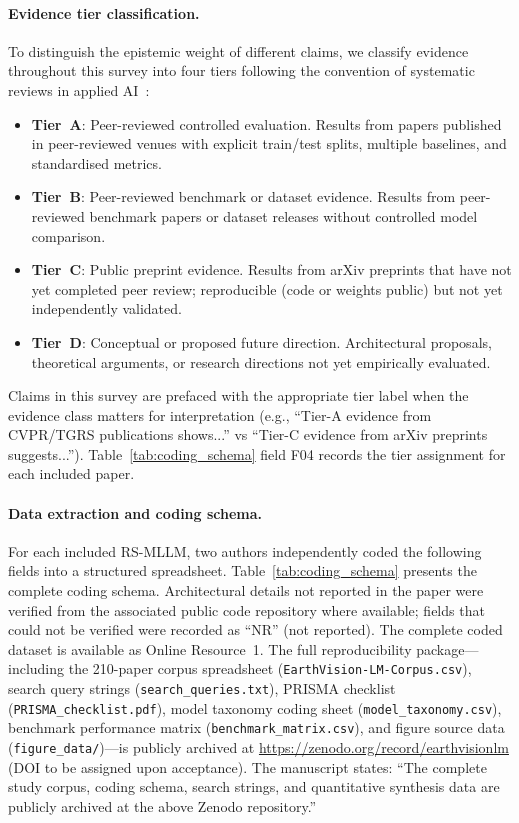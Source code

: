 \paragraph{Evidence tier classification.}
To distinguish the epistemic weight of different claims, we classify
evidence throughout this survey into four tiers following the
convention of systematic reviews in applied AI~\cite{page2021prisma}:

\begin{itemize}
\item \textbf{Tier~A}: Peer-reviewed controlled evaluation.
Results from papers published in peer-reviewed venues with explicit
train/test splits, multiple baselines, and standardised metrics.
\item \textbf{Tier~B}: Peer-reviewed benchmark or dataset evidence.
Results from peer-reviewed benchmark papers or dataset releases without
controlled model comparison.
\item \textbf{Tier~C}: Public preprint evidence.
Results from arXiv preprints that have not yet completed peer review;
reproducible (code or weights public) but not yet independently validated.
\item \textbf{Tier~D}: Conceptual or proposed future direction.
Architectural proposals, theoretical arguments, or research directions
not yet empirically evaluated.
\end{itemize}

Claims in this survey are prefaced with the appropriate tier label when
the evidence class matters for interpretation (e.g., ``Tier-A evidence
from CVPR/TGRS publications shows...'' vs ``Tier-C evidence from arXiv
preprints suggests...''). Table~\ref{tab:coding_schema} field F04 records
the tier assignment for each included paper.

\paragraph{Data extraction and coding schema.}
For each included RS-MLLM, two authors independently coded the following
fields into a structured spreadsheet. Table~\ref{tab:coding_schema} presents
the complete coding schema. Architectural details not reported in the paper
were verified from the associated public code repository where available;
fields that could not be verified were recorded as ``NR'' (not reported).
The complete coded dataset is available as Online Resource~1.
The full reproducibility package---including the 210-paper corpus spreadsheet
(\texttt{EarthVision-LM-Corpus.csv}), search query strings (\texttt{search\_queries.txt}),
PRISMA checklist (\texttt{PRISMA\_checklist.pdf}), model taxonomy coding sheet
(\texttt{model\_taxonomy.csv}), benchmark performance matrix
(\texttt{benchmark\_matrix.csv}), and figure source data (\texttt{figure\_data/})---is
publicly archived at \url{https://zenodo.org/record/earthvisionlm} (DOI to be assigned
upon acceptance). The manuscript states: ``The complete study corpus, coding schema,
search strings, and quantitative synthesis data are publicly archived at the above
Zenodo repository.''

